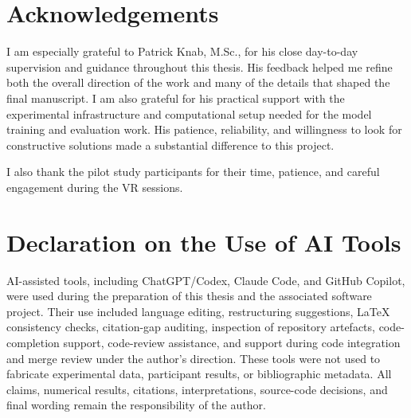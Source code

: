 
\chapter*{Acknowledgements}

I am especially grateful to Patrick Knab, M.Sc., for his close day-to-day
supervision and guidance throughout this thesis. His feedback helped me refine
both the overall direction of the work and many of the details that shaped the
final manuscript.
I am also grateful for his practical support with the experimental
infrastructure and computational setup needed for the model training and
evaluation work. His patience, reliability, and willingness to look for
constructive solutions made a substantial difference to this project.

I also thank the pilot study participants for their time, patience, and careful
engagement during the VR sessions.

\chapter*{Declaration on the Use of AI Tools}

AI-assisted tools, including ChatGPT/Codex, Claude Code, and GitHub Copilot,
were used during the preparation of this thesis and the associated software
project. Their use included language editing, restructuring suggestions, LaTeX
consistency checks, citation-gap auditing, inspection of repository artefacts,
code-completion support, code-review assistance, and support during code
integration and merge review under the author's direction. These tools were not
used to fabricate experimental data, participant results, or bibliographic
metadata. All claims, numerical results, citations, interpretations, source-code
decisions, and final wording remain the responsibility of the author.

